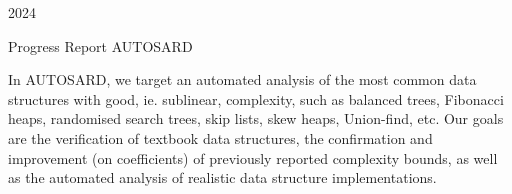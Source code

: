 \documentclass[10pt,a4paper]{article}
\begin{document}

\vspace*{23mm}
\noindent\hspace{35ex}
2024

\vspace*{10mm}

\begin{center}
\large \normalsize Progress Report AUTOSARD 
\end{center}

In AUTOSARD, we target an automated analysis of the most common data structures with good, ie. sublinear, complexity, such as balanced trees, Fibonacci heaps, randomised search trees, skip lists, skew heaps, Union-find, etc. Our goals are the verification of textbook data structures, the confirmation and improvement (on coefficients) of previously reported complexity bounds, as well as the automated analysis of realistic data structure implementations.
\end{document}
